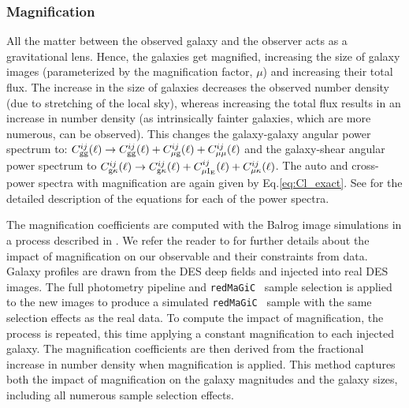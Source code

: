 \documentclass[fleqn,usenatbib]{mnras}
\newcommand{\redmagic}{\texttt{redMaGiC} }
\begin{document}
\subsubsection{Magnification}
All the matter between the observed galaxy and the observer acts as a gravitational lens. Hence, the galaxies get magnified, increasing the size of galaxy images (parameterized by the magnification factor, $\mu$) and increasing their total flux. The increase in the size of galaxies decreases the observed number density (due to stretching of the local sky), whereas increasing the total flux results in an increase in number density (as intrinsically fainter galaxies, which are more numerous, can be observed). This changes the galaxy-galaxy angular power spectrum to: $C^{ij}_{\rm gg}(\ell) \to C^{ij}_{\rm gg}(\ell) + C^{ij}_{\rm \mu g}(\ell) + C^{ij}_{\rm \mu \mu}(\ell) $ and the galaxy-shear angular power spectrum to $C^{ij}_{\rm g\kappa}(\ell) \to C^{ij}_{\rm g\kappa}(\ell) + C^{ij}_{\rm \mu I_{\rm E}}(\ell) + C^{ij}_{\rm \mu \kappa}(\ell)$. The auto and cross-power spectra with magnification are again given by Eq.\ref{eq:Cl_exact}. See \cite{y3-generalmethods} for the detailed description of the equations for each of the power spectra. 

The magnification coefficients are computed with the Balrog image simulations \citep{Suchyta_2016,y3-balrog} in a process described in \cite{y3-2x2ptmagnification}. We refer the reader to \citet{y3-2x2ptmagnification} for further details about the impact of magnification on our observable and their constraints from data. Galaxy profiles are drawn from the DES deep fields \cite{deepfields} and injected into real DES images. The full photometry pipeline \cite{Y3Gold} and \redmagic\ sample selection is applied to the new images to produce a simulated \redmagic\ sample with the same selection effects as the real data. To compute the impact of magnification, the process is repeated, this time applying a constant magnification to each injected galaxy. The magnification coefficients are then derived from the fractional increase in number density when magnification is applied. This method captures both the impact of magnification on the galaxy magnitudes and the galaxy sizes, including all numerous sample selection effects. 
\end{document}
